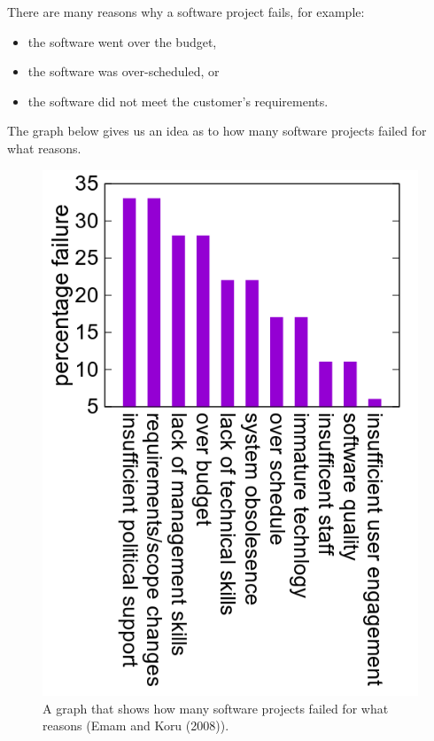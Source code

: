 \documentclass[a4paper, openany]{memoir}
\begin{document}
There are many reasons why a software project fails, for example:
\begin{itemize}
    \item the software went over the budget,
    \item the software was over-scheduled, or
    \item the software did not meet the customer's requirements.
\end{itemize}
The graph below gives us an idea as to how many software projects failed for what reasons.
\begin{figure}[H]
    \centering
    \includegraphics[scale=0.3]{src/1.2 WhyFailureGraph.png}
    \caption{A graph that shows how many software projects failed for what reasons (Emam and Koru (2008)).}
\end{figure}
\end{document}
